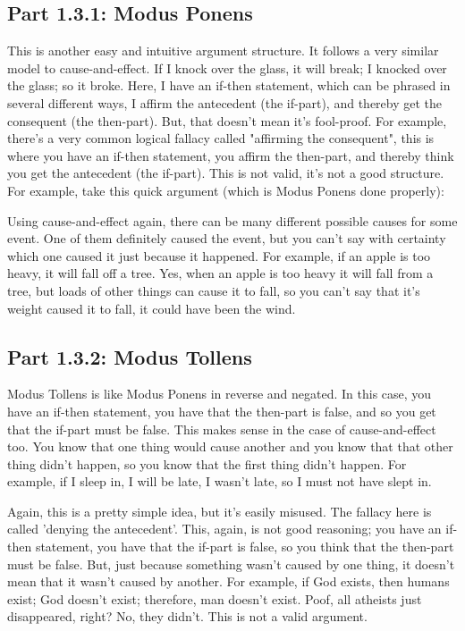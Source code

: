\subsection{Part 1.3.1: Modus Ponens}
\label{s:p1.3.1}

This is another easy and intuitive argument structure. It follows a very similar model to cause-and-effect. If I knock over the glass, it will break; I knocked over the glass; so it broke. Here, I have an if-then statement, which can be phrased in several different ways, I affirm the antecedent (the if-part), and thereby get the consequent (the then-part). But, that doesn't mean it's fool-proof. For example, there's a very common logical fallacy called "affirming the consequent", this is where you have an if-then statement, you affirm the then-part, and thereby think you get the antecedent (the if-part). This is not valid, it's not a good structure. For example, take this quick argument (which is Modus Ponens done properly):


Using cause-and-effect again, there can be many different possible causes for some event. One of them definitely caused the event, but you can't say with certainty which one caused it just because it happened. For example, if an apple is too heavy, it will fall off a tree. Yes, when an apple is too heavy it will fall from a tree, but loads of other things can cause it to fall, so you can't say that it's weight caused it to fall, it could have been the wind.

\subsection{Part 1.3.2: Modus Tollens}
\label{s:p1.3.2}

Modus Tollens is like Modus Ponens in reverse and negated. In this case, you have an if-then statement, you have that the then-part is false, and so you get that the if-part must be false. This makes sense in the case of cause-and-effect too. You know that one thing would cause another and you know that that other thing didn't happen, so you know that the first thing didn't happen. For example, if I sleep in, I will be late, I wasn't late, so I must not have slept in. 

Again, this is a pretty simple idea, but it's easily misused. The fallacy here is called 'denying the antecedent'. This, again, is not good reasoning; you have an if-then statement, you have that the if-part is false, so you think that the then-part must be false. But, just because something wasn't caused by one thing, it doesn't mean that it wasn't caused by another. For example, if God exists, then humans exist; God doesn't exist; therefore, man doesn't exist. Poof, all atheists  just disappeared, right? No, they didn't. This is not a valid argument. 

